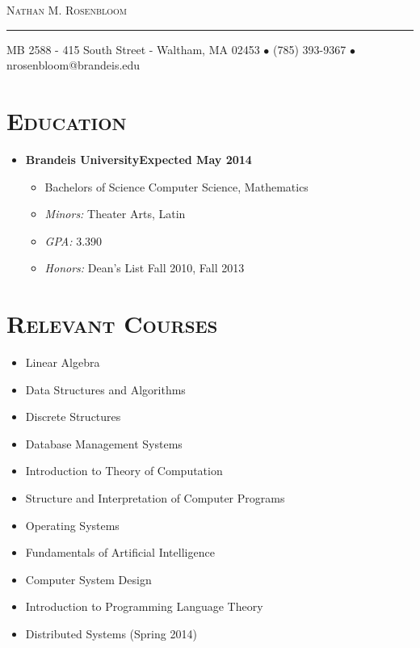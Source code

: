 \documentclass[10pt, oneside]{article}
\makeatletter
\newcommand{\lr}[2]{#1\hfill#2}
\newcommand{\name}{Nathan M. Rosenbloom}
\newcommand{\addr}{MB 2588 - 415 South Street - Waltham, MA 02453}
\newcommand{\phone}{(785) 393-9367}
\newcommand{\email}{nrosenbloom@brandeis.edu}
\newcommand{\resname}[4]{
  \begin{center}
    \selectfont\LARGE\scshape #1
    \normalfont
    \footnotesize
    \itshape
    \rule{\textwidth}{1pt}
    #2 $\bullet$ #3 $\bullet$ #4
    \normalfont
  \end{center}
}
\newcommand{\reseducation}[6]{
  \begin{ressection}{Education}
  \item[] \lr{\bfseries \selectfont #1\normalfont} {Expected #2}
    \vspace{-8pt}
    \begin{itemize} \itemsep-2pt
    \item[] #4
    \item[] \textsl{Minors: }#5
    \item[] \textsl{GPA: }#3
    \item[] \textsl{Honors: }#6
    \end{itemize}
  \end{ressection}
}
\newenvironment{ressection}[1]{
  \section{\normalsize \scshape \selectfont #1 \normalfont}
  \vspace{-4pt}
  \begin{itemize} \itemsep-2pt
  }{
  \end{itemize}
  \vspace{-20pt}
}
\newenvironment{resclasses}
{
  \section{\normalsize \scshape \selectfont Relevant Courses \normalfont}
  \normalfont
  \vspace{-12pt}
  \begin{flushleft}
  \begin{multicols}{3}
    \begin{itemize} \itemsep -3pt
      }{
      \end{itemize}
    \end{multicols}
    \end{flushleft}
  \vspace{-20pt}
}
\makeatother
\begin{document}
\resname{\name}{\addr}{\phone}{\email}
\setcounter{secnumdepth}{-1} %
 
\reseducation{Brandeis University}{May 2014}{3.390}{Bachelors of Science Computer Science, Mathematics}{Theater Arts, Latin}{Dean's List Fall 2010, Fall 2013}
\begin{resclasses}
\item Linear Algebra
\item Data Structures and Algorithms
\item Discrete Structures
\item Database Management Systems
\item Introduction to Theory of Computation
\item Structure and Interpretation of Computer Programs
\item Operating Systems
\item Fundamentals of Artificial Intelligence
\item Computer System Design
\item Introduction to Programming Language Theory
\item Distributed Systems (Spring 2014)
\end{resclasses}
\end{document}
